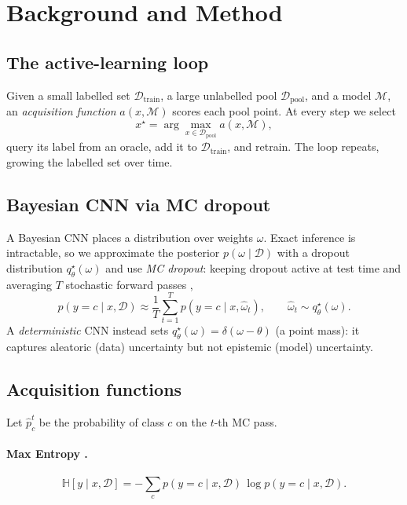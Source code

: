 \documentclass[11pt]{article}
\begin{document}
\section{Background and Method}
\label{sec:method}

\subsection{The active-learning loop}
Given a small labelled set $\mathcal{D}_{\text{train}}$, a large unlabelled pool
$\mathcal{D}_{\text{pool}}$, and a model $\mathcal{M}$, an \emph{acquisition
function} $a(x,\mathcal{M})$ scores each pool point. At every step we select
\begin{equation}
  x^\star = \arg\max_{x \in \mathcal{D}_{\text{pool}}} a(x,\mathcal{M}),
\end{equation}
query its label from an oracle, add it to $\mathcal{D}_{\text{train}}$, and
retrain. The loop repeats, growing the labelled set over time.

\subsection{Bayesian CNN via MC dropout}
A Bayesian CNN places a distribution over weights $\omega$. Exact inference is
intractable, so we approximate the posterior $p(\omega\mid\mathcal{D})$ with a
dropout distribution $q^\star_\theta(\omega)$ and use \emph{MC dropout}: keeping
dropout active at test time and averaging $T$ stochastic forward passes
\cite{gal2016dropout},
\begin{equation}
  p(y=c\mid x,\mathcal{D}) \approx
  \frac{1}{T}\sum_{t=1}^{T} p(y=c\mid x,\hat{\omega}_t),
  \qquad \hat{\omega}_t \sim q^\star_\theta(\omega).
  \label{eq:mcdropout}
\end{equation}
A \emph{deterministic} CNN instead sets $q^\star_\theta(\omega)=\delta(\omega-\theta)$
(a point mass): it captures aleatoric (data) uncertainty but not epistemic
(model) uncertainty.

\subsection{Acquisition functions}
\label{sec:acq}
Let $\hat{p}^t_c$ be the probability of class $c$ on the $t$-th MC pass.

\paragraph{Max Entropy \cite{shannon1948}.}
\begin{equation}
  \mathbb{H}[y\mid x,\mathcal{D}] = -\sum_c p(y=c\mid x,\mathcal{D})\,
  \log p(y=c\mid x,\mathcal{D}).
\end{equation}
\end{document}
